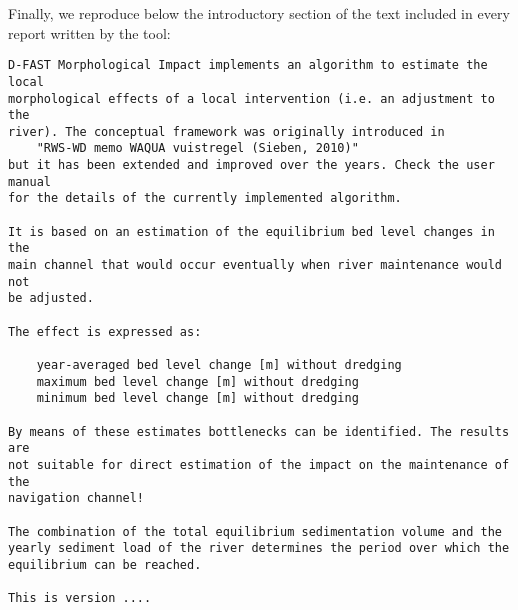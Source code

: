 Finally, we reproduce below the introductory section of the text included in every report written by the tool:

\begin{Verbatim}[frame=single, framesep=5pt]
D-FAST Morphological Impact implements an algorithm to estimate the local
morphological effects of a local intervention (i.e. an adjustment to the
river). The conceptual framework was originally introduced in
    "RWS-WD memo WAQUA vuistregel (Sieben, 2010)"
but it has been extended and improved over the years. Check the user manual
for the details of the currently implemented algorithm.

It is based on an estimation of the equilibrium bed level changes in the
main channel that would occur eventually when river maintenance would not
be adjusted.

The effect is expressed as:

    year-averaged bed level change [m] without dredging
    maximum bed level change [m] without dredging
    minimum bed level change [m] without dredging

By means of these estimates bottlenecks can be identified. The results are
not suitable for direct estimation of the impact on the maintenance of the
navigation channel!

The combination of the total equilibrium sedimentation volume and the
yearly sediment load of the river determines the period over which the
equilibrium can be reached.

This is version ....
\end{Verbatim}
